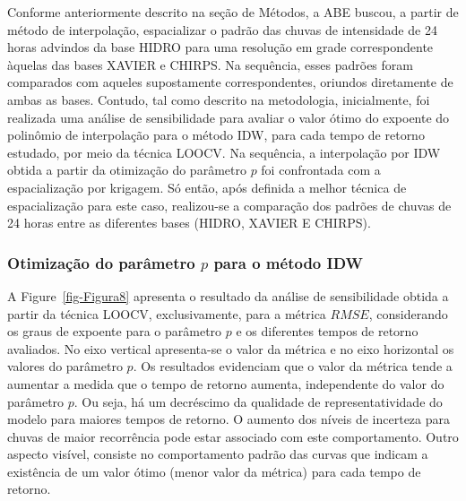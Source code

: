 \documentclass[
]{agujournal2019}
\begin{document}
Conforme anteriormente descrito na seção de Métodos, a ABE buscou, a
partir de método de interpolação, espacializar o padrão das chuvas de
intensidade de 24 horas advindos da base HIDRO para uma resolução em
grade correspondente àquelas das bases XAVIER e CHIRPS. Na sequência,
esses padrões foram comparados com aqueles supostamente correspondentes,
oriundos diretamente de ambas as bases. Contudo, tal como descrito na
metodologia, inicialmente, foi realizada uma análise de sensibilidade
para avaliar o valor ótimo do expoente do polinômio de interpolação para
o método IDW, para cada tempo de retorno estudado, por meio da técnica
LOOCV. Na sequência, a interpolação por IDW obtida a partir da
otimização do parâmetro \(p\) foi confrontada com a espacialização por
krigagem. Só então, após definida a melhor técnica de espacialização
para este caso, realizou-se a comparação dos padrões de chuvas de 24
horas entre as diferentes bases (HIDRO, XAVIER E CHIRPS).

\subsubsection{\texorpdfstring{Otimização do parâmetro \(p\) para o
método
IDW}{Otimização do parâmetro p para o método IDW}}\label{otimizauxe7uxe3o-do-paruxe2metro-p-para-o-muxe9todo-idw}

A Figure~\ref{fig-Figura8} apresenta o resultado da análise de
sensibilidade obtida a partir da técnica LOOCV, exclusivamente, para a
métrica \(RMSE\), considerando os graus de expoente para o parâmetro
\(p\) e os diferentes tempos de retorno avaliados. No eixo vertical
apresenta-se o valor da métrica e no eixo horizontal os valores do
parâmetro \(p\). Os resultados evidenciam que o valor da métrica tende a
aumentar a medida que o tempo de retorno aumenta, independente do valor
do parâmetro \(p\). Ou seja, há um decréscimo da qualidade de
representatividade do modelo para maiores tempos de retorno. O aumento
dos níveis de incerteza para chuvas de maior recorrência pode estar
associado com este comportamento. Outro aspecto visível, consiste no
comportamento padrão das curvas que indicam a existência de um valor
ótimo (menor valor da métrica) para cada tempo de retorno.
\end{document}
